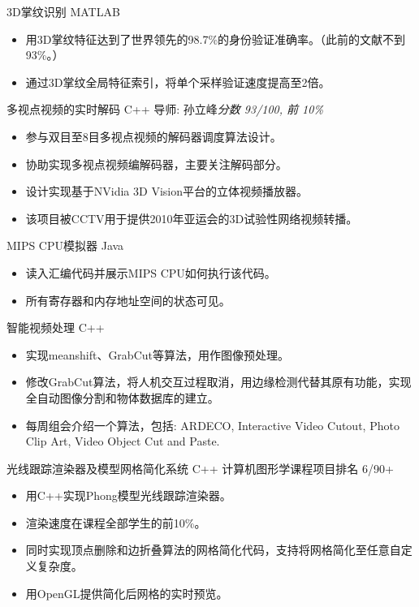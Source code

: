 \documentclass[10pt,a4paper]{moderncv/moderncv}
\begin{document}
{3D掌纹识别}
{MATLAB}
{}{}
{
\begin{itemize}
	\item 用3D掌纹特征达到了世界领先的98.7\%的身份验证准确率。（此前的文献不到93\%。）
	\item 通过3D掌纹全局特征索引，将单个采样验证速度提高至2倍。
\end{itemize}
}

{多视点视频的实时解码}
{C++}
{导师: 孙立峰}{\textit{分数 93/100, 前 10\%}}
{
\begin{itemize}
	\item 参与双目至8目多视点视频的解码器调度算法设计。
	\item 协助实现多视点视频编解码器，主要关注解码部分。
	\item 设计实现基于NVidia 3D Vision平台的立体视频播放器。
	\item 该项目被CCTV用于提供2010年亚运会的3D试验性网络视频转播。
\end{itemize}
}

{MIPS CPU模拟器}
{Java}
{}{}
{
\begin{itemize}
	\item 读入汇编代码并展示MIPS CPU如何执行该代码。
	\item 所有寄存器和内存地址空间的状态可见。
\end{itemize}
}

{智能视频处理}
{C++}
{}{}
{
\begin{itemize}
	\item 实现meanshift、GrabCut等算法，用作图像预处理。
	\item 修改GrabCut算法，将人机交互过程取消，用边缘检测代替其原有功能，实现全自动图像分割和物体数据库的建立。
	\item 每周组会介绍一个算法，包括: ARDECO, Interactive Video Cutout, Photo Clip Art, Video Object Cut and Paste.
\end{itemize}
}

{光线跟踪渲染器及模型网格简化系统}
{C++}
{计算机图形学课程项目}{排名 6/90+}
{
\begin{itemize}
	\item 用C++实现Phong模型光线跟踪渲染器。
	\item 渲染速度在课程全部学生的前10\%。
	\item 同时实现顶点删除和边折叠算法的网格简化代码，支持将网格简化至任意自定义复杂度。
	\item 用OpenGL提供简化后网格的实时预览。
\end{itemize}
}
\end{document}

